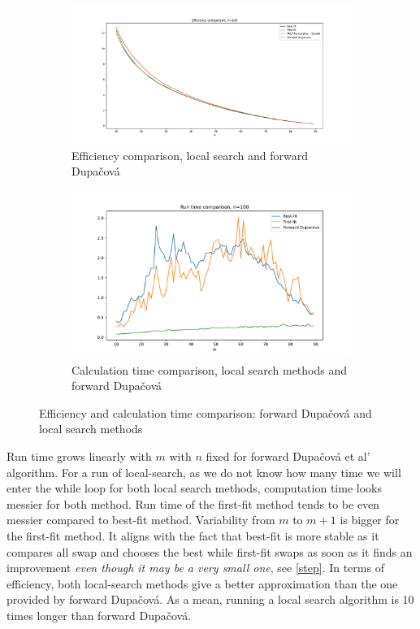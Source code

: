 \documentclass{amsart}
\begin{document}
\begin{figure}[ht]
    \centering
    \begin{subfigure}[b]{0.45\textwidth}
        \centering
        \includegraphics[width=\textwidth]{plots/milp local search efficiency.pdf}
        \caption{Efficiency comparison, local search and forward Dupačová}
        \label{value loc s}
    \end{subfigure}
    \hfill
    \begin{subfigure}[b]{0.45\textwidth}
        \centering
        \includegraphics[width=\textwidth]{plots/run time local search.pdf}
        \caption{Calculation time comparison, local search methods and forward Dupačová}
        \label{time loc s}
    \end{subfigure}
    \caption{Efficiency and calculation time comparison: forward Dupačová and local search methods}
    \label{comparison loc}
\end{figure}

Run time grows linearly with $m$ with $n$ fixed for forward Dupačová et al' algorithm. For a run of local-search, as we do not know how many time we will enter the while loop for both local search methods, computation time looks messier for both method. Run time of the first-fit method tends to be even messier compared to best-fit method. Variability from $m$ to $m+1$ is bigger for the first-fit method. It aligns with the fact that best-fit is more stable as it compares all swap and chooses the best while first-fit swaps as soon as it finds an improvement \emph{even though it may be a very small one}, see \ref{step}. In terms of efficiency, both local-search methods give a better approximation than the one provided by forward Dupačová. As a mean, running a local search algorithm is 10 times longer than forward Dupačová.
\end{document}

